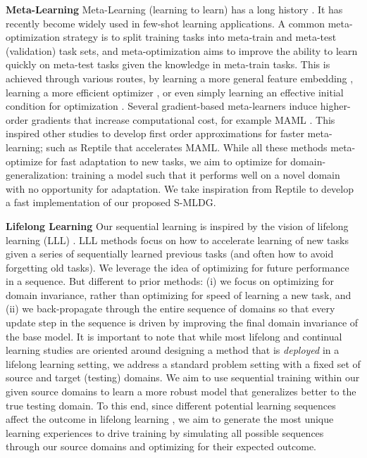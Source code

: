 \documentclass[runningheads]{llncs}
\newcommand{\nameS}{S-MLDG}
\newcommand{\keypoint}[1]{\vspace{0.1cm}\noindent\textbf{#1}\quad}
\begin{document}
\keypoint{Meta-Learning} Meta-Learning (learning to learn) has a long history \cite{Schmidhuber95onlearning}. It has recently become widely used in few-shot learning \cite{andrychowicz2016learning,ravi2016optimization,finn2017model,metanetworks2017} applications. A common meta-optimization strategy is to split training tasks into meta-train and meta-test (validation) task sets, and meta-optimization aims to improve the ability to learn quickly on meta-test tasks given the knowledge in meta-train tasks. This is achieved through various routes, by learning a more general feature embedding \cite{vinyals2016oneShot,sung2018learning}, learning a more efficient optimizer \cite{andrychowicz2016learning,ravi2016optimization}, or even simply learning an effective initial condition for optimization \cite{finn2017model,DBLP:journals/corr/abs-1803-02999}. Several gradient-based meta-learners induce higher-order gradients that increase computational cost, for example MAML \cite{finn2017model}. This inspired other studies to develop first order approximations for faster meta-learning; such as Reptile \cite{DBLP:journals/corr/abs-1803-02999} that accelerates MAML.  While all these methods meta-optimize for fast adaptation to new tasks, we aim to optimize for domain-generalization: training a model such that it performs well on a novel domain with no opportunity for adaptation. We take inspiration from Reptile \cite{DBLP:journals/corr/abs-1803-02999} to develop a fast implementation of our proposed \nameS{}.

\keypoint{Lifelong Learning} Our sequential learning is inspired by the vision of lifelong learning (LLL) \cite{pentina2015lllnoniid,ruvolo2013ella,schmidhuber1997inductiveBias,lopezpaz2017GEM}
. LLL methods focus on how to accelerate learning of new tasks given a series of sequentially learned previous tasks (and often how to avoid forgetting old tasks). We leverage the idea of optimizing for future performance in a sequence. But different to prior methods: (i) we focus on optimizing for domain invariance, rather than optimizing for speed of learning a new task, and (ii) we back-propagate through the entire sequence of domains so that every update step in the sequence is driven by improving the final domain invariance of the base model. It is important to note that while most lifelong and continual learning studies are oriented around designing a method that is \emph{deployed} in a lifelong learning setting, we address a standard problem setting with a fixed set of source and target (testing) domains. We aim to use sequential training within our given source domains to learn a more robust model that generalizes better to the true testing domain. To this end, since different potential learning sequences affect the outcome in lifelong learning \cite{lampert2015curriculum}, we aim to generate the most unique learning experiences to drive training by simulating all possible sequences through our source domains and optimizing for their expected outcome. 
\end{document}

